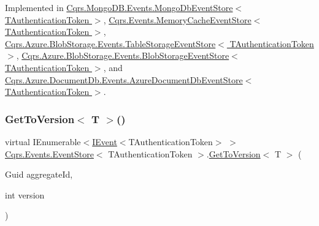 Implemented in \hyperlink{classCqrs_1_1MongoDB_1_1Events_1_1MongoDbEventStore_ad319a5e79600fa5a10c2ecb436533a11_ad319a5e79600fa5a10c2ecb436533a11}{Cqrs.\+Mongo\+D\+B.\+Events.\+Mongo\+Db\+Event\+Store$<$ T\+Authentication\+Token $>$}, \hyperlink{classCqrs_1_1Events_1_1MemoryCacheEventStore_a818fe6785622ebb7b0c6033a0b8ffc89_a818fe6785622ebb7b0c6033a0b8ffc89}{Cqrs.\+Events.\+Memory\+Cache\+Event\+Store$<$ T\+Authentication\+Token $>$}, \hyperlink{classCqrs_1_1Azure_1_1BlobStorage_1_1Events_1_1TableStorageEventStore_ae6bd61257a3218d7ceb51a5ff54fb442_ae6bd61257a3218d7ceb51a5ff54fb442}{Cqrs.\+Azure.\+Blob\+Storage.\+Events.\+Table\+Storage\+Event\+Store$<$ T\+Authentication\+Token $>$}, \hyperlink{classCqrs_1_1Azure_1_1BlobStorage_1_1Events_1_1BlobStorageEventStore_a46382e3a34210cbc655be11eafdc05d6_a46382e3a34210cbc655be11eafdc05d6}{Cqrs.\+Azure.\+Blob\+Storage.\+Events.\+Blob\+Storage\+Event\+Store$<$ T\+Authentication\+Token $>$}, and \hyperlink{classCqrs_1_1Azure_1_1DocumentDb_1_1Events_1_1AzureDocumentDbEventStore_a749548ae5196022867d32bbb5a8dd277_a749548ae5196022867d32bbb5a8dd277}{Cqrs.\+Azure.\+Document\+Db.\+Events.\+Azure\+Document\+Db\+Event\+Store$<$ T\+Authentication\+Token $>$}.

\mbox{\label{classCqrs_1_1Events_1_1EventStore_abbefa3356d8082902bb2b51f2bfab3fc_abbefa3356d8082902bb2b51f2bfab3fc}} 
\subsubsection{\texorpdfstring{Get\+To\+Version$<$ T $>$()}{GetToVersion< T >()}}
{\footnotesize\ttfamily virtual I\+Enumerable$<$\hyperlink{interfaceCqrs_1_1Events_1_1IEvent}{I\+Event}$<$T\+Authentication\+Token$>$ $>$ \hyperlink{classCqrs_1_1Events_1_1EventStore}{Cqrs.\+Events.\+Event\+Store}$<$ T\+Authentication\+Token $>$.\hyperlink{classCqrs_1_1Events_1_1EventStore_a2785f85c9d986cdf11ab6054826c195d_a2785f85c9d986cdf11ab6054826c195d}{Get\+To\+Version}$<$ T $>$ (\begin{DoxyParamCaption}\item[{Guid}]{aggregate\+Id,  }\item[{int}]{version }\end{DoxyParamCaption})\hspace{0.3cm}{\ttfamily [virtual]}}



